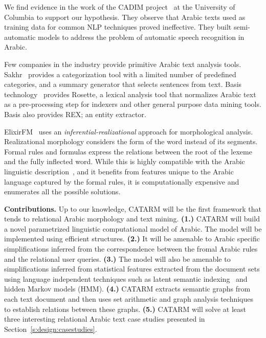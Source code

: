\documentclass[12pt]{article}
\newcommand{\noTrRL}[1]{\transfalse\RL{#1}\transtrue}
\begin{document}
We find evidence in the work of the CADIM \noTrRL{q-adim} 
project~\cite{Col09} at the University of Columbia to support our 
hypothesis. They observe that Arabic texts used as training 
data for common NLP techniques proved ineffective. 
They built semi-automatic models to address the problem of automatic 
speech recognition in Arabic.


Few companies in the industry provide primitive Arabic text 
analysis tools.
Sakhr~\cite{Sak09} provides a categorization 
tool with a limited number of predefined categories, and a summary 
generator that selects sentences from text.
Basis technology~\cite{Bas09} provides Rosette, a lexical 
analysis tool that normalizes Arabic text as a pre-processing step 
for indexers and other general purpose data mining 
tools.  Basis also provides REX; an entity extractor.

ElixirFM~\cite{Otakar:07} uses an {\em inferential-realizational}
approach for morphological analysis. 
Realizational morphology considers the form of the word 
\noTrRL{.sarf}  instead of its segments. 
Formal rules and formulas express the relations between 
the root of the lexeme and the fully inflected word. 
While this is highly compatible with the Arabic linguistic 
description~\cite{Badawi:04},
and it benefits from features unique to the Arabic language
captured by the formal rules, 
it is computationally expensive and enumerates all the possible
solutions. 

{\bf Contributions.} Up to our knowledge, CATARM will be the 
first framework that tends to relational Arabic morphology 
and text mining. 
{\bf (1.)} CATARM will build a novel parametrized linguistic 
computational model of Arabic. 
The model will be implemented using efficient structures. 
 {\bf (2.)} It will be amenable to Arabic specific simplifications 
inferred from the correspondence between the fromal Arabic rules
and the relational user queries.
{\bf (3.)} The model will also be amenable to simplifications 
inferred from statistical features extracted from the document 
sets using language independent techniques such as latent semantic 
indexing~\cite{LSI89} and hidden Markov models (HMM).
{\bf (4.)} CATARM extracts semantic graphs from each text 
document and then uses set arithmetic and graph analysis techniques
to establish relations between these graphs. {\bf (5.)} CATARM will 
solve at least three interesting relational Arabic text case studies 
presented in Section~\ref{s:design:casestudies}.
\end{document}

